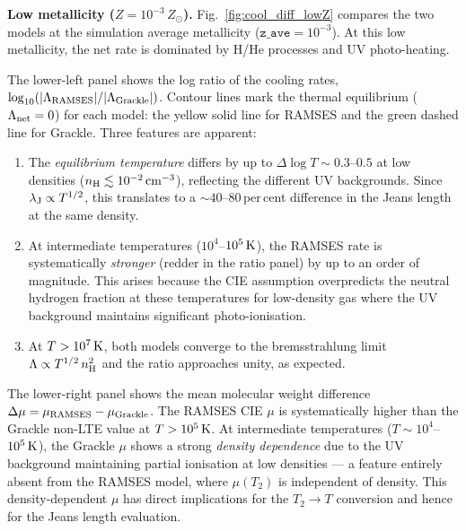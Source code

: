 \documentclass[fleqn,usenatbib]{mnras}
\newcommand{\lJ}{\lambda_{\rm J}}
\newcommand{\code}[1]{\texttt{#1}}
\begin{document}
\textbf{Low metallicity ($Z = 10^{-3}\,Z_\odot$).}
Fig.~\ref{fig:cool_diff_lowZ} compares the two models at the
simulation average metallicity ($\code{z\_ave} = 10^{-3}$).  At this
low metallicity, the net rate is dominated by H/He processes and UV
photo-heating.

The lower-left panel shows the log ratio of the cooling rates,
$\log_{10}(|\Lambda_{\rm RAMSES}|/|\Lambda_{\rm Grackle}|)$.
Contour lines mark the thermal equilibrium ($\Lambda_{\rm net} = 0$)
for each model: the yellow solid line for RAMSES and the green dashed
line for Grackle.  Three features are apparent:
\begin{enumerate}
  \item The \emph{equilibrium temperature} differs by up to
    $\Delta\log T \sim 0.3$--$0.5$ at low densities
    ($n_{\rm H} \lesssim 10^{-2}\,{\rm cm}^{-3}$), reflecting the
    different UV backgrounds.  Since $\lJ \propto T^{1/2}$, this
    translates to a $\sim 40$--$80$\,per\,cent difference in the Jeans
    length at the same density.
  \item At intermediate temperatures ($10^4$--$10^5\,{\rm K}$),
    the RAMSES rate is systematically \emph{stronger} (redder in the
    ratio panel) by up to an order of magnitude.  This arises because
    the CIE assumption overpredicts the neutral hydrogen fraction at
    these temperatures for low-density gas where the UV background
    maintains significant photo-ionisation.
  \item At $T > 10^7\,{\rm K}$, both models converge to the
    bremsstrahlung limit $\Lambda \propto T^{1/2}\,n_{\rm H}^2$ and
    the ratio approaches unity, as expected.
\end{enumerate}

The lower-right panel shows the mean molecular weight difference
$\Delta\mu = \mu_{\rm RAMSES} - \mu_{\rm Grackle}$.  The RAMSES CIE
$\mu$ is systematically higher than the Grackle non-LTE value at
$T > 10^5\,{\rm K}$.  At intermediate temperatures
($T \sim 10^4$--$10^5\,{\rm K}$), the Grackle $\mu$ shows a strong
\emph{density dependence} due to the UV background maintaining partial
ionisation at low densities --- a feature entirely absent from the
RAMSES model, where $\mu(T_2)$ is independent of density.  This
density-dependent $\mu$ has direct implications for the $T_2 \to T$
conversion and hence for the Jeans length evaluation.
\end{document}
